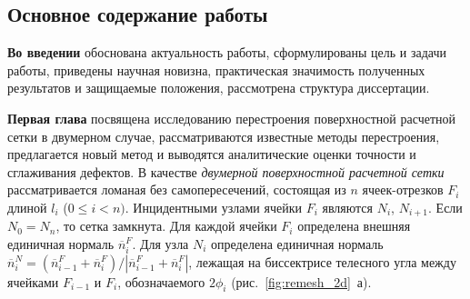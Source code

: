 \documentclass[a4paper,14pt]{extarticle}                     %
\theoremstyle{plain}                                         %
\begin{document}











\newpage
\subsection*{Основное содержание работы}

\textbf{Во введении} обоснована актуальность работы, сформулированы цель и задачи работы, приведены научная новизна, практическая значимость полученных результатов и защищаемые положения, рассмотрена структура диссертации. 




\textbf{Первая глава} посвящена исследованию перестроения поверхностной расчетной сетки в двумерном случае, рассматриваются известные методы перестроения, предлагается новый метод и выводятся аналитические оценки точности и сглаживания дефектов.
В качестве \textit{двумерной поверхностной расчетной сетки} рассматривается ломаная без самопересечений, состоящая из $n$ ячеек-отрезков $F_i$ длиной $l_i$ ($0 \le i < n)$.
Инцидентными узлами ячейки $F_i$ являются $N_i$, $N_{i + 1}$.
Если $N_0 = N_n$, то сетка замкнута.
Для каждой ячейки $F_i$ определена внешняя единичная нормаль $\overline{n}_i^F$.
Для узла $N_i$ определена единичная нормаль $\overline{n}_i^N = (\overline{n}_{i-1}^F + \overline{n}_i^F) / |\overline{n}_{i-1}^F + \overline{n}_i^F|$, лежащая на биссектрисе телесного угла между ячейками $F_{i - 1}$ и $F_i$, обозначаемого $2 \phi_i$ (рис.~\ref{fig:remesh_2d}~а).
\end{document}

